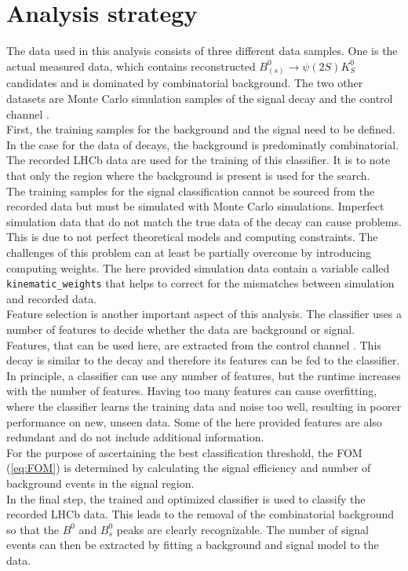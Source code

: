 \section{Analysis strategy}
\label{sec:strategy}
The data used in this analysis consists of three different data samples. One is the actual measured data, which contains reconstructed $B^0_{(s)} \to \psi(2S)K^0_S$ \: candidates
and is dominated by combinatorial background. The two other datasets are Monte Carlo simulation samples of the signal decay \printBstoPsiKs \: 
and the control channel \printBdstoPsiKs. \\
First, the training samples for the background and the signal need to be defined. In the case for the data of \printBdstoPsiKs \: decays, the background is predominatly combinatorial. The recorded LHCb 
data are used for the training of this classifier. It is to note that only the region where the background is present is used for the search. \\
The training samples for the signal classification cannot be sourced from the recorded data but must be simulated with Monte Carlo simulations. Imperfect simulation data 
that do not match the true data of the decay can cause problems. This is due to not perfect theoretical models and computing constraints. The challenges of this problem can at least be partially overcome by introducing 
computing weights. The here provided simulation data contain a variable called \texttt{kinematic\_weights} that helps to correct for the mismatches between simulation and recorded data. \\
Feature selection is another important aspect of this analysis. The classifier uses a number of features to decide whether the data are background or signal. Features, that can be used here, are extracted
from the control channel \printBtoPsiKs. This decay is similar to the decay \printBstoPsiKs \: and therefore its features can be fed to the classifier.
In principle, a classifier can use any number of features, but the runtime increases with the number of features. Having too many features can cause overfitting, 
where the classifier learns the training data and noise too well, resulting in poorer performance on new, unseen data. Some of the here provided features
are also redundant and do not include additional information. \\
For the purpose of ascertaining the best classification threshold, the FOM (\autoref{eq:FOM}) is determined by calculating the signal efficiency and number of background events
in the signal region. \\
In the final step, the trained and optimized classifier is used to classify the recorded LHCb data. This leads to the removal of the combinatorial background so that the $B^0$ and $B^0_s$ peaks are clearly
recognizable. The number of signal events can then be extracted by fitting a background and signal model to the data.
